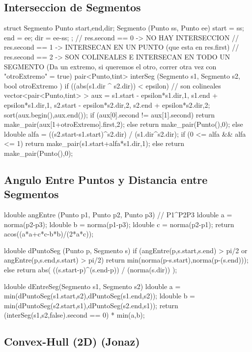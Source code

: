\subsection{Interseccion de Segmentos}
\begin{code}
struct Segmento
{
	Punto start,end,dir;
	Segmento (Punto ss, Punto ee)
	{
		start = ss;
		end = ee;
		dir = ee-ss;
	}
};
// res.second == 0 -> NO HAY INTERSECCION
// res.second == 1 -> INTERSECAN EN UN PUNTO (que esta en res.first)
// res.second == 2 -> SON COLINEALES E INTERSECAN EN TODO UN SEGMENTO (Da un extremo, si queremos el otro, correr otra vez con "otroExtremo" = true)
pair<Punto,tint> interSeg (Segmento s1, Segmento s2, bool otroExtremo ) 
{
	if ((abs(s1.dir ^ s2.dir)) < epsilon) // son colineales
	{
		vector<pair<Punto,tint> > aux = {{s1.start - epsilon*s1.dir,1},
																	 	 {s1.end   + epsilon*s1.dir,1},
															 			 {s2.start - epsilon*s2.dir,2},
															 			 {s2.end   + epsilon*s2.dir,2}};
		sort(aux.begin(),aux.end());
		if (aux[0].second != aux[1].second)
			return make_pair(aux[1+otroExtremo].first,2);
		else
			return make_pair(Punto(),0);
	}
	else
	{
		ldouble alfa = ((s2.start-s1.start)^s2.dir) / (s1.dir^s2.dir);
		if (0 <= alfa && alfa <= 1)
			return make_pair(s1.start+alfa*s1.dir,1);
		else
			return make_pair(Punto(),0);
	}
}
\end{code}

\subsection{Angulo Entre Puntos y Distancia entre Segmentos}
\begin{code}
ldouble angEntre (Punto p1, Punto p2, Punto p3) // P1^P2P3
{
	ldouble a = norma(p2-p3);
	ldouble b = norma(p1-p3);
	ldouble c = norma(p2-p1);
	return acos((a*a+c*c-b*b)/(2*a*c));
}

ldouble dPuntoSeg (Punto p, Segmento s)
{
	if (angEntre(p,s.start,s.end) > pi/2 or angEntre(p,s.end,s.start) > pi/2)
		return min(norma(p-s.start),norma(p-(s.end)));
	else
		return abs( ((s.start-p)^(s.end-p)) / (norma(s.dir)) );
}

ldouble dEntreSeg(Segmento s1, Segmento s2)
{
	ldouble a = min(dPuntoSeg(s1.start,s2),dPuntoSeg(s1.end,s2));
	ldouble b = min(dPuntoSeg(s2.start,s1),dPuntoSeg(s2.end,s1));
	return (interSeg(s1,s2,false).second == 0) * min(a,b);
}
\end{code}

\subsection{Convex-Hull (2D) (Jonaz)}
\begin{code}
\end{code}

